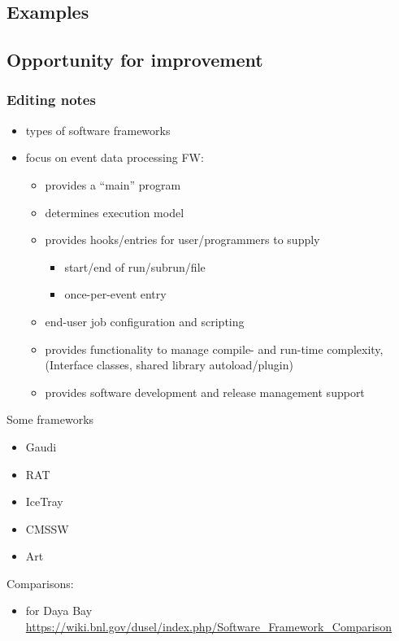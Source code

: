 \subsection{Examples}
\subsection{Opportunity for improvement}



\subsubsection{Editing notes}



\begin{itemize}
\item types of software frameworks
\item focus on event data processing FW:
  \begin{itemize}
  \item provides a ``main'' program
  \item determines execution model
  \item provides hooks/entries for user/programmers to supply
    \begin{itemize}
    \item start/end of run/subrun/file
    \item once-per-event entry
    \end{itemize}
  \item end-user job configuration and scripting
  \item provides functionality to manage compile- and run-time complexity, (Interface classes, shared library autoload/plugin)
  \item provides software development and release management support
  \end{itemize}
\end{itemize}
Some frameworks
\begin{itemize}
\item Gaudi
\item RAT
\item IceTray
\item CMSSW
\item Art
\end{itemize}
Comparisons:
\begin{itemize}
\item for Daya Bay \url{https://wiki.bnl.gov/dusel/index.php/Software_Framework_Comparison}
\end{itemize}
